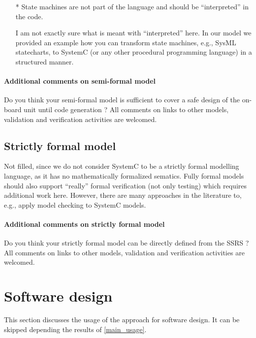 \begin{assessor2}
  \begin{itemize}
  \item[*] State machines are not part of the language and should be
    ``interpreted'' in the code.
\begin{author_comment}
I am not exactly sure what is meant with ``interpreted'' here. In our model we provided an example how you can transform state machines, e.g., SysML statecharts, to SystemC (or any other procedural programming language) in a structured manner.
\end{author_comment}
  \end{itemize}  
\end{assessor2}



\paragraph{Additional comments on semi-formal model} Do you think your semi-formal model is sufficient to cover a safe design of the on-board unit until code generation ?
All comments on links to other models, validation and verification activities are welcomed.

\subsection{Strictly formal model}

\begin{author_comment}
Not filled, since we do not consider SystemC to be a strictly formal modelling language, as it has no mathematically formalized sematics. Fully formal models should also support ``really'' formal verification (not only testing) which requires additional work here. However, there are many approaches in the literature to, e.g., apply model checking to SystemC models.
\end{author_comment}


\paragraph{Additional comments on strictly formal model} Do you think your strictly formal model can be directly defined from the SSRS ?
All comments on links to other models, validation and verification activities are welcomed.


\section{Software design}
This section discusses the usage of the approach for software design.
It can be skipped depending the results of \ref{main_usage}.

